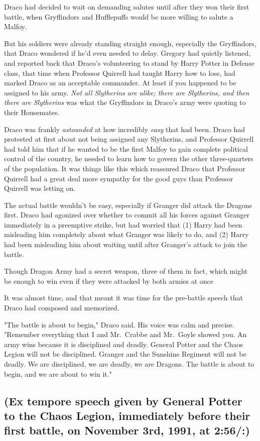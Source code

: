 Draco had decided to wait on demanding salutes until after they won their first
battle, when Gryffindors and Hufflepuffs would be more willing to salute a
Malfoy.

But his soldiers were already standing straight enough, especially the
Gryffindors, that Draco wondered if he'd even needed to delay. Gregory had
quietly listened, and reported back that Draco's volunteering to stand by Harry
Potter in Defense class, that time when Professor Quirrell had taught Harry how
to lose, had marked Draco as an acceptable commander. At least if you happened
to be assigned to his army. \emph{Not all Slytherins are alike; there are
Slytherins, and then there are Slytherins} was what the Gryffindors in Draco's
army were quoting to their Housemates.

Draco was frankly \emph{astounded} at how incredibly \emph{easy} that had been.
Draco had protested at first about not being assigned any Slytherins, and
Professor Quirrell had told him that if he wanted to be the first Malfoy to
gain complete political control of the country, he needed to learn how to
govern the other three-quarters of the population. It was things like this
which reassured Draco that Professor Quirrell had a great deal more sympathy
for the good guys than Professor Quirrell was letting on.

The actual battle wouldn't be easy, especially if Granger did attack the
Dragons first. Draco had agonized over whether to commit all his forces against
Granger immediately in a preemptive strike, but had worried that (1) Harry had
been misleading him completely about what Granger was likely to do, and (2)
Harry had been misleading him about waiting until after Granger's attack to
join the battle.

Though Dragon Army had a secret weapon, three of them in fact, which might be
enough to win even if they were attacked by both armies at once{\el}

It was almost time, and that meant it was time for the pre-battle speech that
Draco had composed and memorized.

"The battle is about to begin," Draco said. His voice was calm and precise.
"Remember everything that I and Mr.~Crabbe and Mr.~Goyle showed you. An army
wins because it is disciplined and deadly. General Potter and the Chaos Legion
will not be disciplined. Granger and the Sunshine Regiment will not be deadly.
We are disciplined, we are deadly, we are Dragons. The battle is about to
begin, and we are about to win it."
\sbreak
\subsection{(Ex tempore speech given by General Potter to the Chaos Legion,
immediately before their first battle, on November 3rd, 1991, at 2:56\PM/:)}

